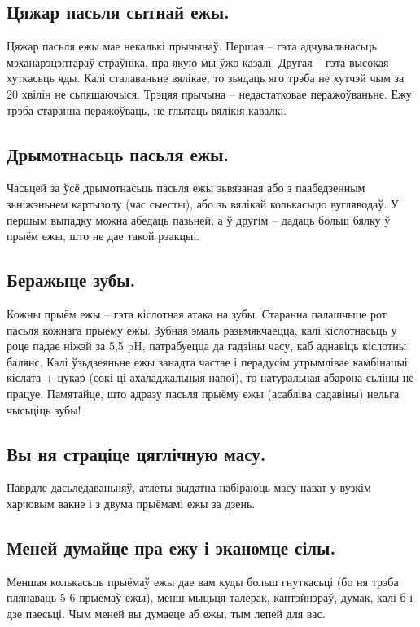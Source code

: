 \subsection{Цяжар пасьля сытнай ежы.}
Цяжар пасьля ежы мае некалькі прычынаў. Першая – гэта адчувальнасьць мэханарэцэптараў страўніка, пра якую мы ўжо казалі. Другая – гэта высокая хуткасьць яды. Калі сталаваньне вялікае, то зьядаць яго трэба не хутчэй чым за 20 хвілін не сьпяшаючыся. Трэцяя прычына – недастатковае перажоўваньне. Ежу трэба старанна перажоўваць, не глытаць вялікія кавалкі.

\subsection{Дрымотнасьць пасьля ежы.}
Часьцей за ўсё дрымотнасьць пасьля ежы зьвязаная або з паабедзенным зьніжэньнем картызолу (час сыесты), або зь вялікай колькасьцю вугляводаў. У першым выпадку можна абедаць пазьней, а ў другім – дадаць больш бялку ў прыём ежы, што не дае такой рэакцыі.

\subsection{Беражыце зубы.}
Кожны прыём ежы – гэта кіслотная атака на зубы. Старанна палашчыце рот пасьля кожнага прыёму ежы. Зубная эмаль разьмякчаецца, калі кіслотнасьць у роце падае ніжэй за 5,5 pH, патрабуецца да гадзіны часу, каб аднавіць кіслотны балянс. Калі ўзьдзеяньне ежы занадта частае і перадусім утрымлівае камбінацыі кіслата + цукар (сокі ці ахаладжальныя напоі), то натуральная абарона сьліны не працуе. Памятайце, што адразу пасьля прыёму ежы (асабліва садавіны) нельга чысьціць зубы!

\subsection{Вы ня страціце цяглічную масу.}
Паврдле дасьледаваньняў, атлеты выдатна набіраюць масу нават у вузкім харчовым вакне і з двума прыёмамі ежы за дзень.

\subsection{Меней думайце пра ежу і эканомце сілы.}
Меншая колькасьць прыёмаў ежы дае вам куды больш гнуткасьці (бо ня трэба плянаваць 5-6 прыёмаў ежы), менш мыцьця талерак, кантэйнэраў, думак, калі б і дзе паесьці. Чым меней вы думаеце аб ежы, тым лепей для вас.

